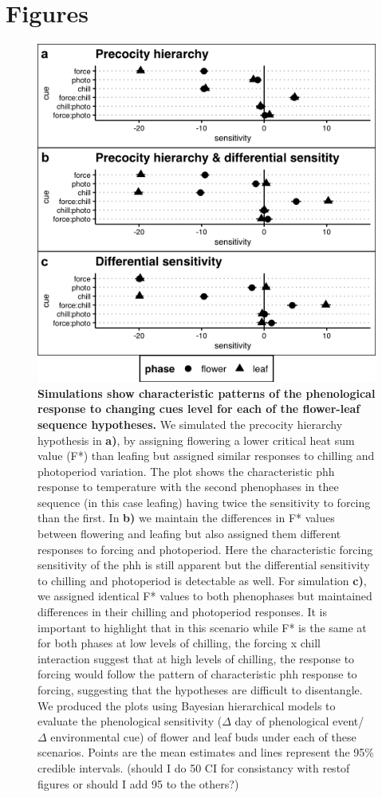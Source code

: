 \documentclass[11pt]{article}\usepackage[]{graphicx}\usepackage[]{color}
\begin{document}
{\section*{Figures}
\begin{figure}[h!]
    \centering
         \includegraphics[width=.8\textwidth]{..//Plots/Flobuds_manuscript_figs/simulations.png}
    \caption{\textbf{Simulations show characteristic patterns of the phenological response to changing cues level for each of the flower-leaf sequence hypotheses.} We simulated the precocity hierarchy hypothesis in \textbf{a)}, by assigning flowering a lower critical heat sum value (F*) than leafing but assigned similar responses to chilling and photoperiod variation. The plot shows the characteristic phh response to temperature with the second phenophases in thee sequence (in this case leafing) having twice the sensitivity to forcing than the first. In \textbf{b)} we maintain the differences in F* values between flowering and leafing but also assigned them different responses to forcing and photoperiod. Here the characteristic forcing sensitivity of the phh is still apparent but the differential sensitivity to chilling and photoperiod is detectable as well. For simulation \textbf{c)}, we assigned identical F* values to both phenophases but maintained differences in their chilling and photoperiod responses. It is important to highlight that in this scenario while F* is the same at for both phases at low levels of chilling, the forcing x chill interaction suggest that at high levels of chilling, the response to forcing would follow the pattern of characteristic phh response to forcing, suggesting that the hypotheses are difficult to disentangle. We produced the plots using Bayesian hierarchical models to evaluate the phenological sensitivity ($\Delta$ day of phenological event/ $\Delta$ environmental cue) of flower and leaf buds under each of these scenarios. Points are the mean estimates and lines represent the 95\% credible intervals. (should I do 50 CI for consistancy with restof figures or should I add 95 to the others?) } 
    \label{fig:simulations}
\end{figure}


}
\end{document}
